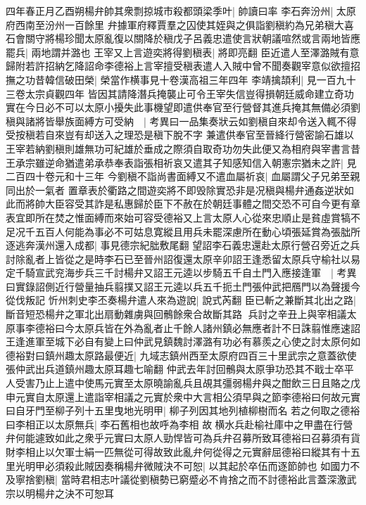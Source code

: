 四年春正月乙酉朔楊弁帥其衆剽掠城市殺都頭梁季叶|{
	帥讀曰率}
李石奔汾州|{
	太原府西南至汾州一百餘里}
弁據軍府釋賈羣之囚使其姪與之俱詣劉稹約為兄弟稹大喜石會關守將楊珍聞太原亂復以關降於稹戊子呂義忠遣使言狀朝議喧然或言兩地皆應罷兵|{
	兩地謂并潞也}
王宰又上言遊奕將得劉稹表|{
	將即亮翻}
臣近遣人至澤潞賊有意歸附若許招納乞降詔命李德裕上言宰擅受稹表遣人入賊中曾不聞奏觀宰意似欲擅招撫之功昔韓信破田榮|{
	榮當作横事見十卷漢高祖三年四年}
李靖擒頡利|{
	見一百九十三卷太宗貞觀四年}
皆因其請降潛兵掩襲止可令王宰失信豈得損朝廷威命建立奇功實在今日必不可以太原小擾失此事機望即遣供奉官至行營督其進兵掩其無備必須劉稹與諸將皆舉族面縛方可受納　|{
	考異曰一品集奏狀云如劉稹自來却令送入輒不得受按稹若自來豈有却送入之理恐是稹下脫不字}
兼遣供奉官至晉絳行營密諭石雄以王宰若納劉稹則雄無功可紀雄於垂成之際須自取奇功勿失此便又為相府與宰書言昔王承宗雖逆命猶遣弟承恭奉表詣張相祈哀又遣其子知感知信入朝憲宗猶未之許|{
	見二百四十卷元和十三年}
今劉稹不詣尚書面縛又不遣血屬祈哀|{
	血屬謂父子兄弟至親同出於一氣者}
置章表於衢路之間遊奕將不即毁除實恐非是况稹與楊弁通姦逆狀如此而將帥大臣容受其詐是私惠歸於臣下不赦在於朝廷事體之間交恐不可自今更有章表宜即所在焚之惟面縛而來始可容受德裕又上言太原人心從來忠順止是貧虛賞犒不足况千五百人何能為事必不可姑息寛縱且用兵未罷深慮所在動心頃張延賞為張朏所逐逃奔漢州還入成都|{
	事見德宗紀朏敷尾翻}
望詔李石義忠還赴太原行營召旁近之兵討除亂者上皆從之是時李石已至晉州詔復還太原辛卯詔王逢悉留太原兵守榆社以易定千騎宣武兖海步兵三千討楊弁又詔王元逵以步騎五千自土門入應接逢軍　|{
	考異曰實錄詔側近行營量抽兵翦撲又詔王元逵以兵五千扼土門張仲武把鴈門以為聲援今從伐叛記}
忻州刺史李丕奏楊弁遣人來為遊說|{
	說式芮翻}
臣已斬之兼斷其北出之路|{
	斷音短恐楊弁之軍北出扇動雜虜與回鶻餘衆合故斷其路}
兵討之辛丑上與宰相議太原事李德裕曰今太原兵皆在外為亂者止千餘人諸州鎮必無應者計不日誅翦惟應速詔王逢進軍至城下必自有變上曰仲武見鎮魏討澤潞有功必有慕羨之心使之討太原何如德裕對曰鎮州趣太原路最便近|{
	九域志鎮州西至太原府四百三十里武宗之意蓋欲使張仲武出兵道鎮州趣太原耳趣七喻翻}
仲武去年討回鶻與太原爭功恐其不戢士卒平人受害乃止上遣中使馬元實至太原曉諭亂兵且覘其彊弱楊弁與之酣飲三日且賂之戊申元實自太原還上遣詣宰相議之元實於衆中大言相公須早與之節李德裕曰何故元實曰自牙門至柳子列十五里曳地光明甲|{
	柳子列因其地列植柳樹而名}
若之何取之德裕曰李相正以太原無兵|{
	李石舊相也故呼為李相}
故横水兵赴榆社庫中之甲盡在行營弁何能遽致如此之衆乎元實曰太原人勁悍皆可為兵弁召募所致耳德裕曰召募須有貨財李相止以欠軍士絹一匹無從可得故致此亂弁何從得之元實辭屈德裕曰縱其有十五里光明甲必須殺此賊因奏稱楊弁微賊決不可恕|{
	以其起於卒伍而逐節帥也}
如國力不及寧捨劉稹|{
	當時君相志叶議從劉稹勢已窮蹙必不肯捨之而不討德裕此言蓋深激武宗以明楊弁之決不可恕耳}

